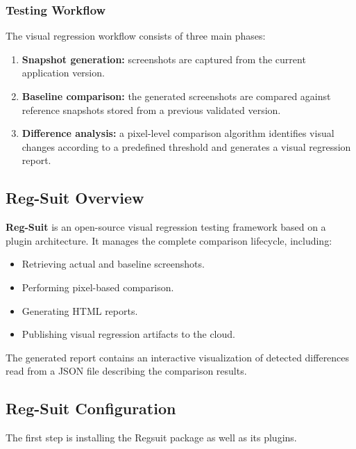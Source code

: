 \subsubsection{Testing Workflow}

The visual regression workflow consists of three main phases:

\begin{enumerate}
    \item \textbf{Snapshot generation:} screenshots are captured from the current application version.
    
    \item \textbf{Baseline comparison:} the generated screenshots are compared against reference snapshots stored from a previous validated version.
    
    \item \textbf{Difference analysis:} a pixel-level comparison algorithm identifies visual changes according to a predefined threshold and generates a visual regression report.
\end{enumerate}


\subsection{Reg-Suit Overview}

\textbf{Reg-Suit} is an open-source visual regression testing framework based on a plugin architecture. It manages the complete comparison lifecycle, including:

\begin{itemize}
    \item Retrieving actual and baseline screenshots.
    \item Performing pixel-based comparison.
    \item Generating HTML reports.
    \item Publishing visual regression artifacts to the cloud.
\end{itemize}

The generated report contains an interactive visualization of detected differences read from a JSON file describing the comparison results.

\subsection{Reg-Suit Configuration}

The first step is installing the Regsuit package as well as its plugins.

